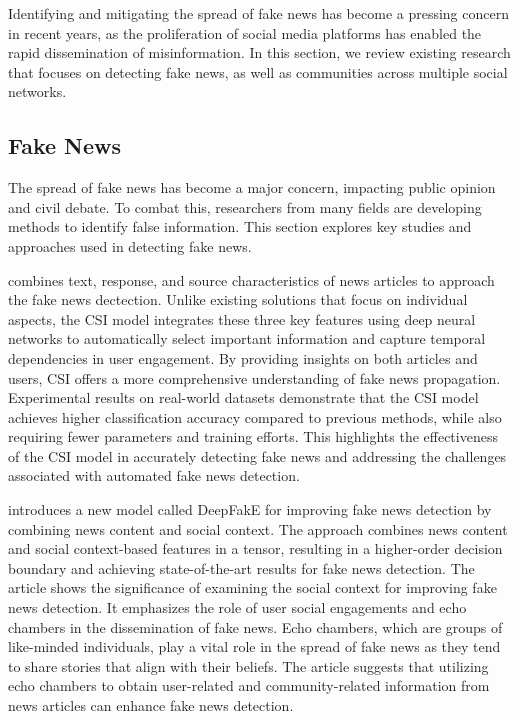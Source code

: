 \documentclass[12pt]{article}
\begin{document}
Identifying and mitigating the spread of fake news has become a pressing concern in recent years,
as the proliferation of social media platforms has enabled the rapid dissemination of
misinformation.
In this section, we review existing research that focuses on detecting fake news,
as well as  communities across multiple social networks.

\subsection{Fake News}

The spread of fake news has become a major concern, impacting public opinion and civil debate.
To combat this, researchers from many fields are developing methods to identify false information.
This section explores key studies and approaches used in detecting fake news.

\cite{Ruchansky_2017} combines text, response, and source characteristics of news articles to approach
the fake news dectection.
Unlike existing solutions that focus on individual aspects, the CSI model integrates these three
key features using deep neural networks to automatically select important information and capture
temporal dependencies in user engagement. By providing insights on both articles and users,
CSI offers a more comprehensive understanding of fake news propagation. Experimental results on
real-world datasets demonstrate that the CSI model achieves higher classification accuracy compared
to previous methods, while also requiring fewer parameters and training efforts.
This highlights the effectiveness of the CSI model in accurately detecting fake
news and addressing the challenges associated with automated fake news detection.

\cite{DeepFakE} introduces a new model called DeepFakE for improving fake news detection by combining news content and social context.
The approach combines news content and social context-based features in a tensor,
resulting in a higher-order decision boundary and achieving state-of-the-art results for fake news detection.
The article shows the significance of examining the social context for improving fake news detection.
It emphasizes the role of user social engagements and echo chambers in the dissemination of fake news.
Echo chambers, which are groups of like-minded individuals, play a vital role in the spread of fake news as
they tend to share stories that align with their beliefs.
The article suggests that utilizing echo chambers to obtain user-related and community-related
information from news articles can enhance fake news detection.
\end{document}
